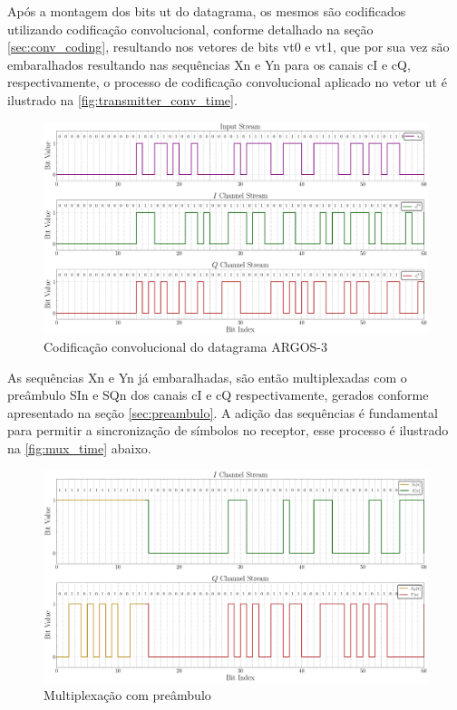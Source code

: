 Após a montagem dos bits \gls{ut} do datagrama, os mesmos são codificados utilizando codificação convolucional, conforme detalhado na seção \ref{sec:conv_coding}, resultando nos vetores de bits \gls{vt0} e \gls{vt1}, que por sua vez são embaralhados resultando nas sequências \gls{Xn} e \gls{Yn} para os canais \gls{cI} e \gls{cQ}, respectivamente, o processo de codificação convolucional aplicado no vetor \gls{ut} é ilustrado na \autoref{fig:transmitter_conv_time}.

\begin{figure}[H]
	\centering
	\caption{Codificação convolucional do datagrama ARGOS-3}\label{fig:transmitter_conv_time}
	\includegraphics[width=\linewidth]{assets/cap3/transmitter_conv_time.pdf}
\end{figure}

As sequências \gls{Xn} e \gls{Yn} já embaralhadas, são então multiplexadas com o preâmbulo \gls{SIn} e \gls{SQn} dos canais \gls{cI} e \gls{cQ} respectivamente, gerados conforme apresentado na seção \ref{sec:preambulo}. A adição das sequências é fundamental para permitir a sincronização de símbolos no receptor, esse processo é ilustrado na \autoref{fig:mux_time} abaixo.

\begin{figure}[H]
	\centering
	\caption{Multiplexação com preâmbulo}\label{fig:mux_time}
	\includegraphics[width=\linewidth]{assets/cap3/transmitter_mux_time.pdf}
\end{figure}

